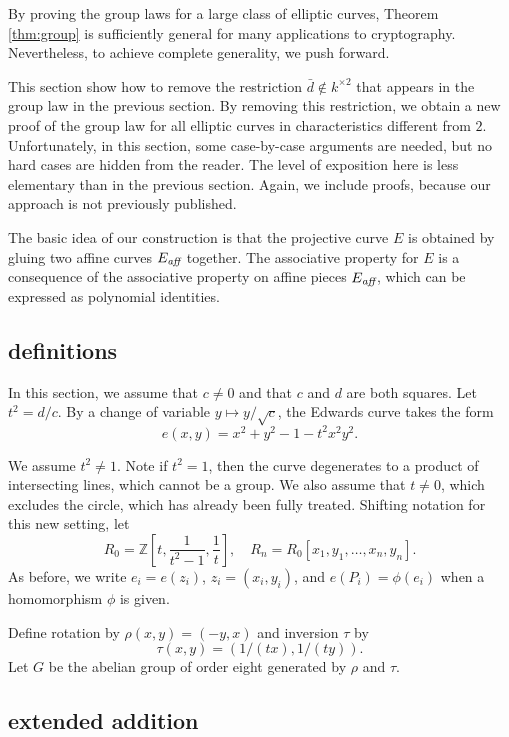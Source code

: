 \documentclass{llncs}
\newcommand{\ring}[1]{\mathbb{#1}}
\newcommand{\op}[1]{\hbox{#1}}
\newcommand{\Eaff}{E_{\op{\scriptsize\it aff}}}
\begin{document}
By proving the group laws for a large class of elliptic curves,
Theorem \ref{thm:group} is sufficiently general for many applications
to cryptography.  Nevertheless, to achieve complete generality, we
push forward.

This section show how to remove the restriction $\bar d\not\in
k^{\times 2}$ that appears in the group law in the previous section.
By removing this restriction, we obtain a new proof of the group law
for all elliptic curves in characteristics different from $2$.
Unfortunately, in this section, some case-by-case arguments are
needed, but no hard cases are hidden from the reader.  The level of
exposition here is less elementary than in the previous section.
Again, we include proofs, because our approach is not previously published.

The basic idea of our construction is that the projective
curve $E$ is obtained by gluing two affine curves $\Eaff$
together.  The associative property for $E$ is a consequence
of the associative property on affine pieces $\Eaff$, which
can be expressed as polynomial identities.



\subsection{definitions}

In this section, we assume that $c\ne 0$ and that $c$ and $d$ are both
squares.  Let $t^2 = d/c$.  By a change of variable $y\mapsto
y/\sqrt{c}$, the Edwards curve takes the form
\begin{equation}\label{eqn:t}
e(x,y)= x^2 + y^2 -1 - t^2 x^2 y^2.
\end{equation}

We assume $t^2\ne 1$.  Note if $t^2=1$, then 
the curve degenerates to a product of intersecting lines, which
cannot be a group.  We also assume that $t\ne 0$, which excludes the
circle, which has already been fully treated.  Shifting notation for
this new setting, let
\[
R_0 = \ring{Z}[t,\frac{1}{t^2-1},\frac1t],\quad
R_n = R_0[x_1,y_1,\ldots,x_n,y_n].
\]
As before, we write $e_i = e(z_i)$, $z_i=(x_i,y_i)$, and $ e(P_i) =
\phi(e_i)$ when a homomorphism $\phi$ is given.

Define rotation by $\rho(x,y)=(-y,x)$ and inversion $\tau$ by
\[
\tau(x,y) = (1/(tx),1/(ty)).
\]
Let $G$ be the abelian group of order eight generated by $\rho$ and
$\tau$.


\subsection{extended addition}
\end{document}
